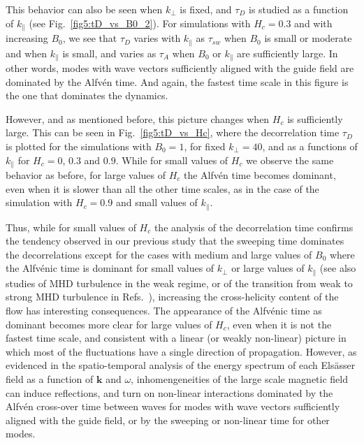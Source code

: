 \documentclass[aip,pop,reprint,amsmath,amssymb,floatfix]{revtex4-1}
\renewcommand{\vec}[1]{\mathbf{#1}}
\begin{document}
This behavior can also be seen when $k_\perp$ is fixed, and $\tau_D$ is studied as a function of $k_\parallel$ (see Fig.~\ref{fig5:tD_vs_B0_2}). For simulations with $H_c=0.3$ and with increasing $B_0$, we see that $\tau_D$ varies with $k_\parallel$ as $\tau_{sw}$ when $B_0$ is small or moderate and when $k_\parallel$ is small, and varies as $\tau_A$ when $B_0$ or $k_\parallel$ are sufficiently large. In other words, modes with wave vectors sufficiently aligned with the guide field are dominated by the Alfv\'en time. And again, the fastest time scale in this figure is the one that dominates the dynamics.

However, and as mentioned before, this picture changes when $H_c$ is sufficiently large. This can be seen in Fig.~\ref{fig5:tD_vs_Hc}, where the decorrelation time $\tau_D$ is plotted for the simulations with $B_0=1$, for fixed $k_\perp=40$, and as a functions of $k_\parallel$ for $H_c = 0$, $0.3$ and $0.9$. While for small values of $H_c$ we observe the same behavior as before, for large values of $H_c$ the Alfv\'en time becomes dominant, even when it is slower than all the other time scales, as in the case of the simulation with $H_c=0.9$ and small values of $k_\parallel$.

Thus, while for small values of $H_c$ the analysis of the decorrelation time confirms the tendency observed in our previous study \cite{lugones_2016_spatiotemporal} that the sweeping time dominates the decorrelations except for the cases with medium and large values of $B_0$ where the Alfv\'enic time is dominant for small values of $k_{\perp}$ or large values of $k_{\parallel}$ (see also studies of MHD turbulence in the weak regime, or of the transition from weak to strong MHD turbulence in Refs.~\cite{meyrand_weak_2015, lugones_2016_spatiotemporal, meyrand_direct_2016}), increasing the cross-helicity content of the flow has interesting consequences. The appearance of the Alfv\'enic time as dominant becomes more clear for large values of $H_c$, even when it is not the fastest time scale, and consistent with a linear (or weakly non-linear) picture in which most of the fluctuations have a single direction of propagation. However, as evidenced in the spatio-temporal analysis of the energy spectrum of each Els\"asser field as a function of $\vec{k}$ and $\omega$, inhomengeneities of the large scale magnetic field can induce reflections, and turn on non-linear interactions dominated by the Alfv\'en cross-over time between waves for modes with wave vectors sufficiently aligned with the guide field, or by the sweeping or non-linear time for other modes.
\end{document}
